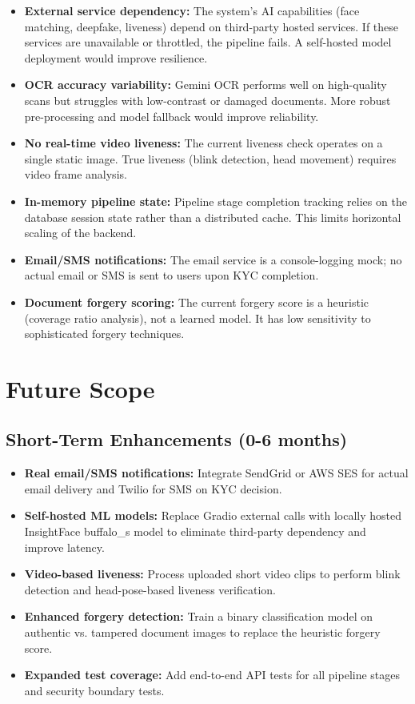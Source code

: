 \begin{itemize}
    \item \textbf{External service dependency:} The system's AI capabilities (face matching, deepfake, liveness) depend on third-party hosted services. If these services are unavailable or throttled, the pipeline fails. A self-hosted model deployment would improve resilience.

    \item \textbf{OCR accuracy variability:} Gemini OCR performs well on high-quality scans but struggles with low-contrast or damaged documents. More robust pre-processing and model fallback would improve reliability.

    \item \textbf{No real-time video liveness:} The current liveness check operates on a single static image. True liveness (blink detection, head movement) requires video frame analysis.

    \item \textbf{In-memory pipeline state:} Pipeline stage completion tracking relies on the database session state rather than a distributed cache. This limits horizontal scaling of the backend.

    \item \textbf{Email/SMS notifications:} The email service is a console-logging mock; no actual email or SMS is sent to users upon KYC completion.

    \item \textbf{Document forgery scoring:} The current forgery score is a heuristic (coverage ratio analysis), not a learned model. It has low sensitivity to sophisticated forgery techniques.
\end{itemize}

\section{Future Scope}

\subsection{Short-Term Enhancements (0-6 months)}
\begin{itemize}
    \item \textbf{Real email/SMS notifications:} Integrate SendGrid or AWS SES for actual email delivery and Twilio for SMS on KYC decision.
    \item \textbf{Self-hosted ML models:} Replace Gradio external calls with locally hosted InsightFace buffalo\_s model to eliminate third-party dependency and improve latency.
    \item \textbf{Video-based liveness:} Process uploaded short video clips to perform blink detection and head-pose-based liveness verification.
    \item \textbf{Enhanced forgery detection:} Train a binary classification model on authentic vs. tampered document images to replace the heuristic forgery score.
    \item \textbf{Expanded test coverage:} Add end-to-end API tests for all pipeline stages and security boundary tests.
\end{itemize}


